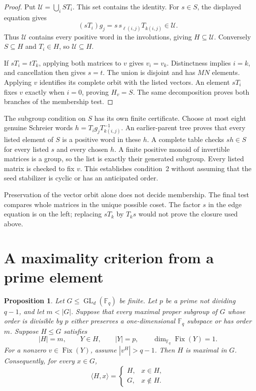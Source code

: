 \documentclass[11pt]{article}
\newtheorem{proposition}{Proposition}
\begin{document}
\begin{proof}
Put $\mathcal U=\bigcup_i S T_i$. This set contains the identity.
For $s\in S$, the displayed equation gives
\[
        (sT_i)g_j=s\,s_{\ell(i,j)}T_{k(i,j)}\in\mathcal U.
\]
Thus $\mathcal U$ contains every positive word in the involutions,
giving $H\subseteq\mathcal U$. Conversely $S\subseteq H$ and $T_i\in H$,
so $\mathcal U\subseteq H$.

If $sT_i=tT_k$, applying both matrices to $v$ gives $v_i=v_k$.
Distinctness implies $i=k$, and cancellation then gives $s=t$.
The union is disjoint and has $MN$ elements. Applying $v$ identifies its
complete orbit with the listed vectors. An element $sT_i$ fixes $v$
exactly when $i=0$, proving $H_v=S$. The same decomposition proves
both branches of the membership test.
\end{proof}

The subgroup condition on $S$ has its own finite certificate.
Choose at most eight genuine Schreier words
$h=T_i g_jT_{k(i,j)}^{-1}$. An earlier-parent tree proves that every
listed element of $S$ is a positive word in these $h$. A complete table
checks $sh\in S$ for every listed $s$ and every chosen $h$.
A finite positive monoid of invertible matrices is a group, so the list
is exactly their generated subgroup. Every listed matrix is checked
to fix $v$. This establishes condition~2 without assuming that the
seed stabilizer is cyclic or has an anticipated order.

Preservation of the vector orbit alone does not decide membership.
The final test compares whole matrices in the unique possible coset.
The factor $s$ in the edge equation is on the left; replacing $sT_k$
by $T_ks$ would not prove the closure used above.

\section{A maximality criterion from a prime element}

\begin{proposition}\label{prop:maximal}
Let $G\leq\operatorname{GL}_d(\mathbb F_q)$ be finite. Let $p$ be a
prime not dividing $q-1$, and let $m<|G|$. Suppose that every maximal
proper subgroup of $G$ whose order is divisible by $p$ either preserves
a one-dimensional $\mathbb F_q$ subspace or has order $m$.
Suppose $H\leq G$ satisfies
\[
 |H|=m,\qquad Y\in H,\qquad |Y|=p,\qquad
 \dim_{\mathbb F_q}\operatorname{Fix}(Y)=1.
\]
For a nonzero $v\in\operatorname{Fix}(Y)$, assume $|v^H|>q-1$.
Then $H$ is maximal in $G$. Consequently, for every $x\in G$,
\[
 \langle H,x\rangle=
 \begin{cases}
 H,&x\in H,\\
 G,&x\notin H.
 \end{cases}
\]
\end{proposition}
\end{document}
